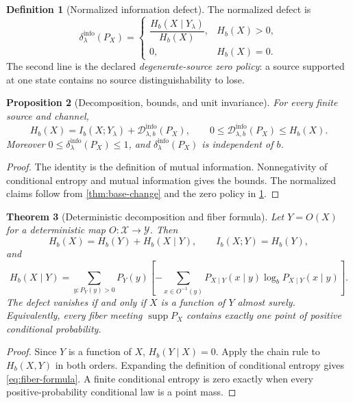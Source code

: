 \documentclass[11pt,a4paper]{article}
\theoremstyle{definition}
\newtheorem{definition}{Definition}[section]
\theoremstyle{plain}
\newtheorem{theorem}[definition]{Theorem}
\newtheorem{proposition}[definition]{Proposition}
\theoremstyle{remark}
\newcommand{\X}{\mathcal{X}}
\newcommand{\Y}{\mathcal{Y}}
\newcommand{\1}{\mathbf{1}}
\newcommand{\supp}{\operatorname{supp}}
\newcommand{\Hb}{H_b}
\newcommand{\Ib}{I_b}
\newcommand{\Dinfo}{\mathscr{D}^{\mathrm{info}}}
\newcommand{\dinfo}{\delta^{\mathrm{info}}}
\begin{document}
\begin{definition}[Normalized information defect]
\label{def:normalized-defect}
The normalized defect is
\[
\dinfo_{\lambda}(P_X)
=
\begin{cases}
\dfrac{\Hb(X\mid Y_\lambda)}{\Hb(X)},&\Hb(X)>0,\\[1.1ex]
0,&\Hb(X)=0.
\end{cases}
\]
The second line is the declared \emph{degenerate-source zero policy}: a
source supported at one state contains no source distinguishability to
lose.
\end{definition}

\begin{proposition}[Decomposition, bounds, and unit invariance]
\label{prop:defect-bounds}
For every finite source and channel,
\[
\Hb(X)
=
\Ib(X;Y_\lambda)+\Dinfo_{\lambda,b}(P_X),
\qquad
0\leq \Dinfo_{\lambda,b}(P_X)\leq \Hb(X).
\]
Moreover $0\leq\dinfo_\lambda(P_X)\leq1$, and
$\dinfo_\lambda(P_X)$ is independent of $b$.
\end{proposition}

\begin{proof}
The identity is the definition of mutual information. Nonnegativity of
conditional entropy and mutual information gives the bounds. The normalized
claims follow from \cref{thm:base-change} and the zero policy in
\cref{def:normalized-defect}.
\end{proof}

\begin{theorem}[Deterministic decomposition and fiber formula]
\label{thm:fiber}
Let $Y=O(X)$ for a deterministic map $O:\X\to\Y$. Then
\[
\Hb(X)=\Hb(Y)+\Hb(X\mid Y),
\qquad
\Ib(X;Y)=\Hb(Y),
\]
and
\begin{equation}
\Hb(X\mid Y)
=
\sum_{y:P_Y(y)>0}P_Y(y)
\left[
-\sum_{x\in O^{-1}(y)}
P_{X\mid Y}(x\mid y)\log_bP_{X\mid Y}(x\mid y)
\right].
\label{eq:fiber-formula}
\end{equation}
The defect vanishes if and only if $X$ is a function of $Y$ almost surely.
Equivalently, every fiber meeting $\supp P_X$ contains exactly one point
of positive conditional probability.
\end{theorem}

\begin{proof}
Since $Y$ is a function of $X$, $\Hb(Y\mid X)=0$. Apply the chain rule to
$\Hb(X,Y)$ in both orders. Expanding the definition of conditional entropy
gives \eqref{eq:fiber-formula}. A finite conditional entropy is zero exactly
when every positive-probability conditional law is a point mass.
\end{proof}
\end{document}
